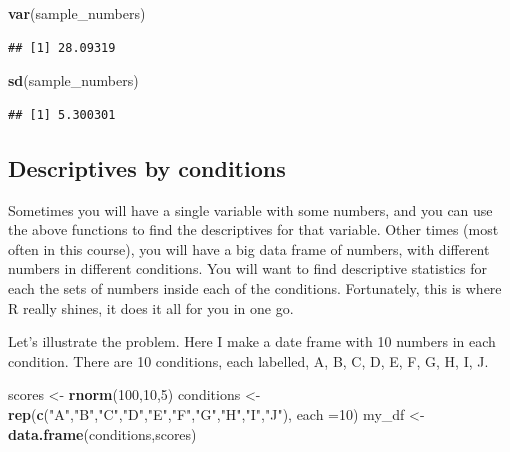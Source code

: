 \documentclass[]{book}
\newenvironment{Shaded}{\begin{snugshade}}{\end{snugshade}}
\newcommand{\KeywordTok}[1]{\textcolor[rgb]{0.13,0.29,0.53}{\textbf{#1}}}
\newcommand{\DataTypeTok}[1]{\textcolor[rgb]{0.13,0.29,0.53}{#1}}
\newcommand{\DecValTok}[1]{\textcolor[rgb]{0.00,0.00,0.81}{#1}}
\newcommand{\StringTok}[1]{\textcolor[rgb]{0.31,0.60,0.02}{#1}}
\newcommand{\NormalTok}[1]{#1}
\begin{document}
\begin{Shaded}
\begin{Highlighting}[]
\KeywordTok{var}\NormalTok{(sample_numbers)}
\end{Highlighting}
\end{Shaded}

\begin{verbatim}
## [1] 28.09319
\end{verbatim}

\begin{Shaded}
\begin{Highlighting}[]
\KeywordTok{sd}\NormalTok{(sample_numbers)}
\end{Highlighting}
\end{Shaded}

\begin{verbatim}
## [1] 5.300301
\end{verbatim}

\subsection{Descriptives by
conditions}\label{descriptives-by-conditions}

Sometimes you will have a single variable with some numbers, and you can
use the above functions to find the descriptives for that variable.
Other times (most often in this course), you will have a big data frame
of numbers, with different numbers in different conditions. You will
want to find descriptive statistics for each the sets of numbers inside
each of the conditions. Fortunately, this is where R really shines, it
does it all for you in one go.

Let's illustrate the problem. Here I make a date frame with 10 numbers
in each condition. There are 10 conditions, each labelled, A, B, C, D,
E, F, G, H, I, J.

\begin{Shaded}
\begin{Highlighting}[]
\NormalTok{scores <-}\StringTok{ }\KeywordTok{rnorm}\NormalTok{(}\DecValTok{100}\NormalTok{,}\DecValTok{10}\NormalTok{,}\DecValTok{5}\NormalTok{)}
\NormalTok{conditions <-}\StringTok{ }\KeywordTok{rep}\NormalTok{(}\KeywordTok{c}\NormalTok{(}\StringTok{"A"}\NormalTok{,}\StringTok{"B"}\NormalTok{,}\StringTok{"C"}\NormalTok{,}\StringTok{"D"}\NormalTok{,}\StringTok{"E"}\NormalTok{,}\StringTok{"F"}\NormalTok{,}\StringTok{"G"}\NormalTok{,}\StringTok{"H"}\NormalTok{,}\StringTok{"I"}\NormalTok{,}\StringTok{"J"}\NormalTok{), }\DataTypeTok{each =}\DecValTok{10}\NormalTok{)}
\NormalTok{my_df <-}\StringTok{ }\KeywordTok{data.frame}\NormalTok{(conditions,scores)}
\end{Highlighting}
\end{Shaded}
\end{document}
